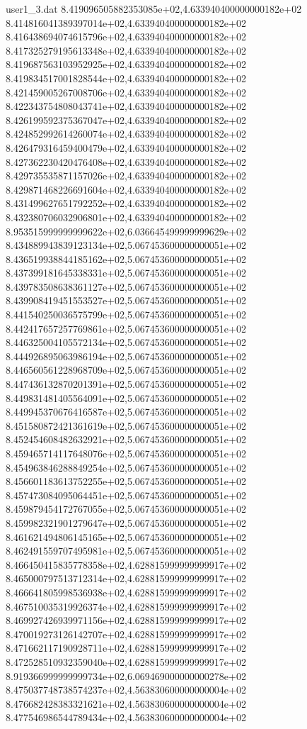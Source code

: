 \begin{filecontents}{user1_3.dat}
8.419096505882353085e+02,4.633940400000000182e+02
8.414816041389397014e+02,4.633940400000000182e+02
8.416438694074615796e+02,4.633940400000000182e+02
8.417325279195613348e+02,4.633940400000000182e+02
8.419687563103952925e+02,4.633940400000000182e+02
8.419834517001828544e+02,4.633940400000000182e+02
8.421459005267008706e+02,4.633940400000000182e+02
8.422343754808043741e+02,4.633940400000000182e+02
8.426199592375367047e+02,4.633940400000000182e+02
8.424852992614260074e+02,4.633940400000000182e+02
8.426479316459400479e+02,4.633940400000000182e+02
8.427362230420476408e+02,4.633940400000000182e+02
8.429735535871157026e+02,4.633940400000000182e+02
8.429871468226691604e+02,4.633940400000000182e+02
8.431499627651792252e+02,4.633940400000000182e+02
8.432380706032906801e+02,4.633940400000000182e+02
8.953515999999999622e+02,6.036645499999999629e+02
8.434889943839123134e+02,5.067453600000000051e+02
8.436519938844185162e+02,5.067453600000000051e+02
8.437399181645338331e+02,5.067453600000000051e+02
8.439783508638361127e+02,5.067453600000000051e+02
8.439908419451553527e+02,5.067453600000000051e+02
8.441540250036575799e+02,5.067453600000000051e+02
8.442417657257769861e+02,5.067453600000000051e+02
8.446325004105572134e+02,5.067453600000000051e+02
8.444926895063986194e+02,5.067453600000000051e+02
8.446560561228968709e+02,5.067453600000000051e+02
8.447436132870201391e+02,5.067453600000000051e+02
8.449831481405564091e+02,5.067453600000000051e+02
8.449945370676416587e+02,5.067453600000000051e+02
8.451580872421361619e+02,5.067453600000000051e+02
8.452454608482632921e+02,5.067453600000000051e+02
8.459465714117648076e+02,5.067453600000000051e+02
8.454963846288849254e+02,5.067453600000000051e+02
8.456601183613752255e+02,5.067453600000000051e+02
8.457473084095064451e+02,5.067453600000000051e+02
8.459879454172767055e+02,5.067453600000000051e+02
8.459982321901279647e+02,5.067453600000000051e+02
8.461621494806145165e+02,5.067453600000000051e+02
8.462491559707495981e+02,5.067453600000000051e+02
8.466450415835778358e+02,4.628815999999999917e+02
8.465000797513712314e+02,4.628815999999999917e+02
8.466641805998536938e+02,4.628815999999999917e+02
8.467510035319926374e+02,4.628815999999999917e+02
8.469927426939971156e+02,4.628815999999999917e+02
8.470019273126142707e+02,4.628815999999999917e+02
8.471662117190928711e+02,4.628815999999999917e+02
8.472528510932359040e+02,4.628815999999999917e+02
8.919366999999999734e+02,6.069469000000000278e+02
8.475037748738574237e+02,4.563830600000000004e+02
8.476682428383321621e+02,4.563830600000000004e+02
8.477546986544789434e+02,4.563830600000000004e+02

\end{filecontents}
